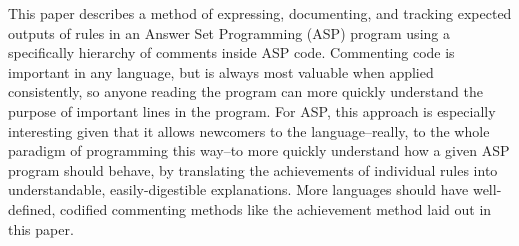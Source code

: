 \documentclass{article}
\begin{document}
  
  \graphicspath{{./images/}}
\par This paper describes a method of expressing, documenting, and tracking expected outputs of rules in an Answer Set Programming (ASP) program using a specifically hierarchy of comments inside ASP code.
Commenting code is important in any language, but is always most valuable when applied consistently, so anyone reading the program can more quickly understand the purpose of important lines in the program.
For ASP, this approach is especially interesting given that it allows newcomers to the language--really, to the whole paradigm of programming this way--to more quickly understand how a given ASP program should behave, by translating the achievements of individual rules into understandable, easily-digestible explanations.
More languages should have well-defined, codified commenting methods like the achievement method laid out in this paper.
\end{document}
